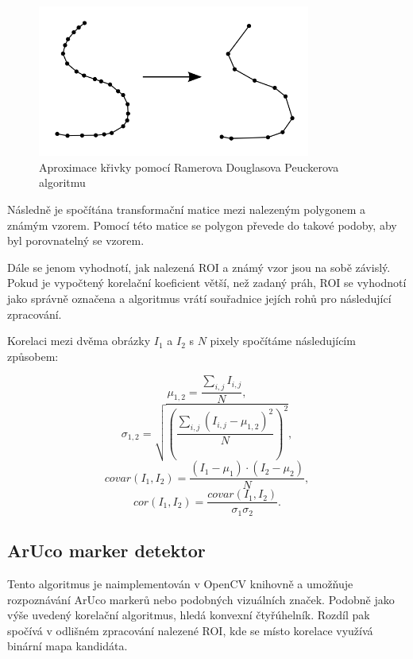 \documentclass[twoside]{ctuthesis}
\theoremstyle{plain}
\theoremstyle{definition}
\theoremstyle{note}
\begin{document}
\begin{figure}
	
	\caption{Aproximace křivky pomocí Ramerova Douglasova Peuckerova algoritmu}
	
	\label{approx}
	\includegraphics[width=0.8\textwidth]{images/2/approx.png}
\end{figure}


Následně je spočítána transformační matice mezi nalezeným polygonem a známým vzorem. Pomocí této matice se polygon převede do takové podoby, aby byl porovnatelný se vzorem.

Dále se jenom vyhodnotí, jak nalezená ROI a známý vzor jsou na sobě závislý. Pokud je vypočtený korelační koeficient větší, než zadaný práh, ROI se vyhodnotí jako správně označena a algoritmus vrátí souřadnice jejích rohů pro následující zpracování.

Korelaci mezi dvěma obrázky $I_1$ a $I_2$ s $N$ pixely spočítáme následujícím způsobem:

	\begin{equation}
	\mu_{1,2} = \frac{\sum_{i,j}I_{i,j}}{N},
	\end{equation}
	\begin{equation}
	\sigma_{1,2} = \sqrt{\left(\frac{\sum_{i,j}(I_{i,j} - \mu_{1,2})^2}{N}\right)^2},
	\end{equation}
	\begin{equation}
	covar(I_1, I_2) = \frac{(I_1 - \mu_1)\cdot(I_2 - \mu_2)}{N},
	\end{equation}	
	\begin{equation}
	cor(I_1, I_2) = \frac{covar(I_1, I_2)}{\sigma_1 \sigma_2}.
	\end{equation}
	
\subsection{ArUco marker detektor}
	
Tento algoritmus je naimplementován v OpenCV knihovně a umožňuje rozpoznávání ArUco markerů nebo podobných vizuálních značek. Podobně jako výše uvedený korelační algoritmus, hledá konvexní čtyřúhelník. Rozdíl pak spočívá v odlišném zpracování nalezené ROI, kde se místo korelace využívá binární mapa kandidáta.
\end{document}
